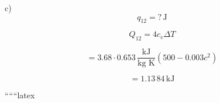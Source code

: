 c) \\
\[ q_{12} = ? \, \text{J} \]

\[
Q_{12} = 4 c_v \Delta T
\]

\[
= 3.68 \cdot 0.653 \, \frac{\text{kJ}}{\text{kg K}} \left(500 - 0.003c^2\right)
\]

\[
= 1.13 \, 84 \, \text{kJ}
\]

``````latex